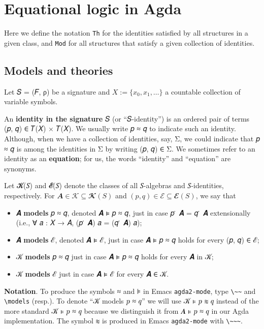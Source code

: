 \documentclass[a4paper,USenglish,cleveref,autoref,thm-restate]{lipics-v2019}
\begin{document}

\section{Equational logic in Agda}\label{sec:equational-logic-in-agda}
Here we define the notation \texttt{Th} for the identities satisfied by all structures in a given class, and \texttt{Mod} for all structures that satisfy a given collection of identities.


\subsection{Models and theories}\label{sec:models-and-theories}
Let 𝑆 = (𝐹, ρ) be a signature and \(X := \{x_0, x_1, \dots\}\) a countable collection of variable symbols.

An \textbf{identity in the signature} 𝑆 (or ``𝑆-identity'') is an ordered pair of terms (𝑝, 𝑞) ∈ 𝑇(𝑋) × 𝑇(𝑋). We usually write 𝑝 ≈ 𝑞 to indicate such an identity. Although, when we have a collection of identities, say, Σ, we could indicate that 𝑝 ≈ 𝑞 is among the identities in Σ by writing (𝑝, 𝑞) ∈ Σ. We sometimes refer to an identity as an \textbf{equation}; for us, the words ``identity'' and ``equation'' are synonyms.

Let 𝓚(𝑆) and 𝓔(𝑆) denote the classes of all 𝑆-algebras and 𝑆-identities, respectively. For \(𝑨 ∈ 𝒦 ⊆ 𝓚(𝑆)\) and \((𝑝, 𝑞) ∈ ℰ ⊆ 𝓔(𝑆)\), we say that
\begin{itemize}
\item 𝑨 \textbf{models} 𝑝 ≈ 𝑞, denoted 𝑨 ⊧ 𝑝 ≈ 𝑞, just in case 𝑝 ̇ 𝑨 = 𝑞 ̇ 𝑨 extensionally (i.e., ∀ 𝑎 : 𝑋 → 𝐴, (𝑝 ̇ 𝑨) 𝑎 = (𝑞 ̇ 𝑨) 𝑎);
\item 𝑨 \textbf{models} ℰ, denoted 𝑨 ⊧ ℰ, just in case 𝑨 ⊧ 𝑝 ≈ 𝑞 holds for every (𝑝, 𝑞) ∈ ℰ;
\item 𝒦 \textbf{models} 𝑝 ≈ 𝑞 just in case 𝑨 ⊧ 𝑝 ≈ 𝑞 holds for every 𝑨 in 𝒦;
\item 𝒦 \textbf{models} ℰ just in case 𝑨 ⊧ ℰ for every 𝑨 ∈ 𝒦.
\end{itemize}

\noindent \textbf{Notation}. To produce the symbols ≈ and ⊧ in Emacs \texttt{agda2-mode}, type \texttt{\textbackslash{}\textasciitilde{}\textasciitilde{}} and \texttt{\textbackslash{}models} (resp.). To denote ``𝒦 models 𝑝 ≈ 𝑞'' we will use 𝒦 ⊧ 𝑝 ≋ 𝑞 instead of the more standard 𝒦 ⊧ 𝑝 ≈ 𝑞 because we distinguish it from 𝑨 ⊧ 𝑝 ≈ 𝑞 in our Agda implementation. The symbol ≋ is produced in Emacs \texttt{agda2-mode} with \texttt{\textbackslash{}\textasciitilde{}\textasciitilde{}\textasciitilde{}}.
\end{document}
